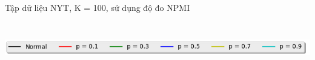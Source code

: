 \documentclass[pdf]{beamer}
\begin{document}
\begin{frame}{Tập dữ liệu NYT, K = 100, sử dụng độ đo NPMI }
\begin{columns}[T] %
	\begin{column}{.50\textwidth}
		\begin{figure}
		\end{figure}
	\end{column} %
	\hfill%
	\begin{column}{.50\textwidth}
		\begin{figure}
		\end{figure}				
	\end{column} %
\end{columns}
\begin{center}
	\includegraphics[width=1\textwidth]{menu.png}	
\end{center}
\end{frame}
\end{document}
